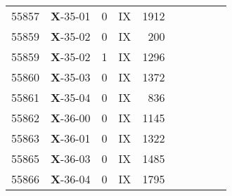 \begin{table*}
\begin{tabular}{llllrllllr}
55857&\textbf{X}-35-01&0&IX&1912&&&&&\\
55859&\textbf{X}-35-02&0&IX&200&&&&&\\
55859&\textbf{X}-35-02&1&IX&1296&&&&&\\
55860&\textbf{X}-35-03&0&IX&1372&&&&&\\
55861&\textbf{X}-35-04&0&IX&836&&&&&\\
55862&\textbf{X}-36-00&0&IX&1145&&&&&\\
55863&\textbf{X}-36-01&0&IX&1322&&&&&\\
55865&\textbf{X}-36-03&0&IX&1485&&&&&\\
55866&\textbf{X}-36-04&0&IX&1795&&&&&\\
\hline
\hline
\end{tabular}
\end{table*}